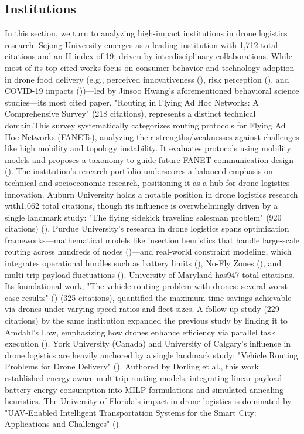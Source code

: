\documentclass{article}
\begin{document}
\subsection{Institutions}
In this section, we turn to analyzing high-impact institutions in drone logistics research.​​ ​​Sejong University​​ emerges as a leading institution with ​​1,712 total citations​​ and an ​​H-index of 19​​, driven by interdisciplinary collaborations. While most of its top-cited works focus on ​​consumer behavior and technology adoption​​ in drone food delivery (e.g., perceived innovativeness (\cite{WOS:000478712400012}), risk perception (\cite{WOS:000495004400013}), and COVID-19 impacts (\cite{WOS:000605628800016}))—led by ​​Jinsoo Hwang​​’s aforementioned behavioral science studies—its most cited paper, "Routing in Flying Ad Hoc Networks: A Comprehensive Survey" (218 citations), represents a distinct technical domain.This survey systematically categorizes routing protocols for ​​Flying Ad Hoc Networks (FANETs)​​, analyzing their strengths/weaknesses against challenges like high mobility and topology instability. It evaluates protocols using mobility models and proposes a taxonomy to guide future FANET communication design (\cite{WOS:000538038400010})​​. The institution’s research portfolio underscores a balanced emphasis on ​​technical and ​​socioeconomic research, positioning it as a hub for drone logistics innovation. Auburn University​​ holds a notable position in drone logistics research with ​​1,062 total citations​​, though its influence is overwhelmingly driven by a single landmark study: "The flying sidekick traveling salesman problem" (920 citations) (\cite{WOS:000353871700006}). ​​Purdue University's research in drone logistics spans optimization frameworks​​—mathematical models like insertion heuristics that handle large-scale routing across hundreds of nodes (\cite{WOS:000460496000002})—and ​​real-world constraint modeling​​, which integrates operational hurdles such as battery limits (\cite{WOS:000532795300023}), No-Fly Zones (\cite{WOS:000474324300017}), and multi-trip payload fluctuations (\cite{WOS:000523602300006}). University of Maryland has ​​947 total citations​​. Its foundational work, "The vehicle routing problem with drones: several worst-case results" (\cite{WOS:000400384200003})  (325 citations), quantified the maximum time savings achievable via drones under varying speed ratios and fleet sizes. A follow-up study  (229 citations) by the same institution expanded the previous study by linking it to ​​Amdahl’s Law​​, emphasizing how drones enhance efficiency via ​​parallel task execution (\cite{WOS:000404719400004})​​. ​​York University (Canada) and University of Calgary's influence in drone logistics are heavily anchored by a single landmark study: "Vehicle Routing Problems for Drone Delivery" (\cite{WOS:000391480400007}). Authored by Dorling et al., this work established ​​energy-aware multitrip routing models​​, integrating linear payload-battery energy consumption into MILP formulations and simulated annealing heuristics. The University of Florida's impact in drone logistics is dominated by "UAV-Enabled Intelligent Transportation Systems for the Smart City: Applications and Challenges" (\cite{WOS:000398037700003}) 
\end{document}
